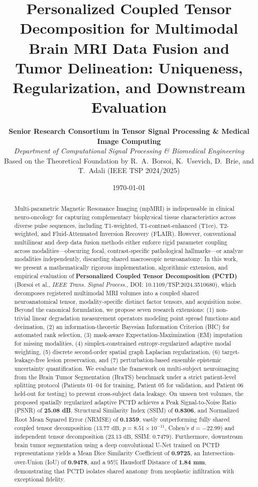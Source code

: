 \documentclass[11pt,a4paper]{article}
\title{\textbf{\LARGE Personalized Coupled Tensor Decomposition for Multimodal Brain MRI Data Fusion and Tumor Delineation: Uniqueness, Regularization, and Downstream Evaluation}}
\author{
    \textbf{Senior Research Consortium in Tensor Signal Processing \& Medical Image Computing}\\
    \textit{Department of Computational Signal Processing \& Biomedical Engineering}\\
    \small Based on the Theoretical Foundation by R.~A.~Borsoi, K.~Usevich, D.~Brie, and T.~Adali (IEEE TSP 2024/2025)
}
\date{\today}
\begin{document}
\maketitle

\begin{abstract}
\noindent Multi-parametric Magnetic Resonance Imaging (mpMRI) is indispensable in clinical neuro-oncology for capturing complementary biophysical tissue characteristics across diverse pulse sequences, including T1-weighted, T1-contrast-enhanced (T1ce), T2-weighted, and Fluid-Attenuated Inversion Recovery (FLAIR). However, conventional multilinear and deep data fusion methods either enforce rigid parameter coupling across modalities---obscuring focal, contrast-specific pathological hallmarks---or analyze modalities independently, discarding shared macroscopic neuroanatomy. In this work, we present a mathematically rigorous implementation, algorithmic extension, and empirical evaluation of \textbf{Personalized Coupled Tensor Decomposition (PCTD)} (Borsoi et al., \emph{IEEE Trans. Signal Process.}, DOI: 10.1109/TSP.2024.3510680), which decomposes registered multimodal MRI volumes into a coupled shared neuroanatomical tensor, modality-specific distinct factor tensors, and acquisition noise. Beyond the canonical formulation, we propose seven research extensions: (1) non-trivial linear degradation measurement operators modeling point spread functions and decimation, (2) an information-theoretic Bayesian Information Criterion (BIC) for automated rank selection, (3) mask-aware Expectation-Maximization (EM) imputation for missing modalities, (4) simplex-constrained entropy-regularized adaptive modal weighting, (5) discrete second-order spatial graph Laplacian regularization, (6) target-leakage-free lesion preservation, and (7) perturbation-based ensemble epistemic uncertainty quantification. We evaluate the framework on multi-subject neuroimaging from the Brain Tumor Segmentation (BraTS) benchmark under a strict patient-level splitting protocol (Patients 01--04 for training, Patient 05 for validation, and Patient 06 held-out for testing) to prevent cross-subject data leakage. On unseen test volumes, the proposed spatially regularized adaptive PCTD achieves a Peak Signal-to-Noise Ratio (PSNR) of \textbf{25.08 dB}, Structural Similarity Index (SSIM) of \textbf{0.8306}, and Normalized Root Mean Squared Error (NRMSE) of \textbf{0.1359}, vastly outperforming fully shared coupled tensor decomposition ($13.77\text{ dB}$, $p = 8.51 \times 10^{-11}$, Cohen's $d = -22.99$) and independent tensor decomposition ($23.13\text{ dB}$, SSIM: $0.7479$). Furthermore, downstream brain tumor segmentation using a deep convolutional U-Net trained on PCTD representations yields a Mean Dice Similarity Coefficient of \textbf{0.9725}, an Intersection-over-Union (IoU) of \textbf{0.9478}, and a 95\% Hausdorff Distance of \textbf{1.84 mm}, demonstrating that PCTD isolates shared anatomy from neoplastic infiltration with exceptional fidelity.
\end{abstract}
\end{document}
